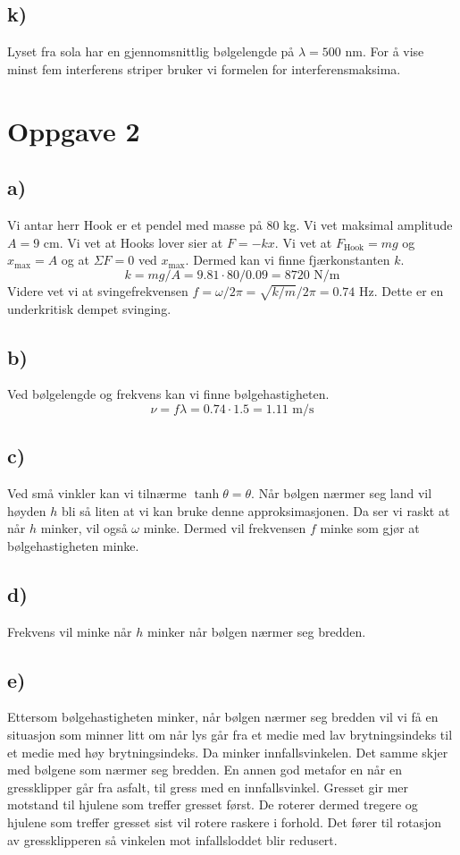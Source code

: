 \documentclass{article}
\begin{document}
  \subsection*{k)}
    Lyset fra sola har en gjennomsnittlig bølgelengde på $λ = 500$ nm. For å vise minst fem interferens striper bruker vi formelen for interferensmaksima.
    

\section*{Oppgave 2}
  \subsection*{a)}
    Vi antar herr Hook er et pendel med masse på $80$ kg. Vi vet maksimal amplitude $A=9$ cm. Vi vet at Hooks lover sier at $F = -kx$. Vi vet at $F_{\text{Hook}} = mg$ og $x_{\text{max}} = A$ og at $ΣF = 0$ ved $x_{\text{max}}$. Dermed kan vi finne fjærkonstanten $k$. 
    \[
    k = mg / A = 9.81 ⋅ 80 / 0.09 = 8720 \text{ N/m}
    \]
    Videre vet vi at svingefrekvensen $f = ω / 2π = \sqrt{k / m} / 2π = 0.74$ Hz. Dette er en underkritisk dempet svinging.   
  
  \subsection*{b)}
    Ved bølgelengde og frekvens kan vi finne bølgehastigheten.
    \[
    ν = fλ = 0.74 ⋅ 1.5 = 1.11 \text{ m/s}
    \]
    
  \subsection*{c)}
    Ved små vinkler kan vi tilnærme $\tanh θ = θ$. Når bølgen nærmer seg land vil høyden $h$ bli så liten at vi kan bruke denne approksimasjonen. Da ser vi raskt at når $h$ minker, vil også $ω$ minke. Dermed vil frekvensen $f$ minke som gjør at bølgehastigheten minke. 
    
  \subsection*{d)}
    Frekvens vil minke når $h$ minker når bølgen nærmer seg bredden. 
    
  \subsection*{e)}
    Ettersom bølgehastigheten minker, når bølgen nærmer seg bredden vil vi få en situasjon som minner litt om når lys går fra et medie med lav brytningsindeks til et medie med høy brytningsindeks. Da minker innfallsvinkelen. Det samme skjer med bølgene som nærmer seg bredden. En annen god metafor en når en gressklipper går fra asfalt, til gress med en innfallsvinkel. Gresset gir mer motstand til hjulene som treffer gresset først. De roterer dermed tregere og hjulene som treffer gresset sist vil rotere raskere i forhold. Det fører til rotasjon av gressklipperen så vinkelen mot infallsloddet blir redusert. 
    
\end{document}

